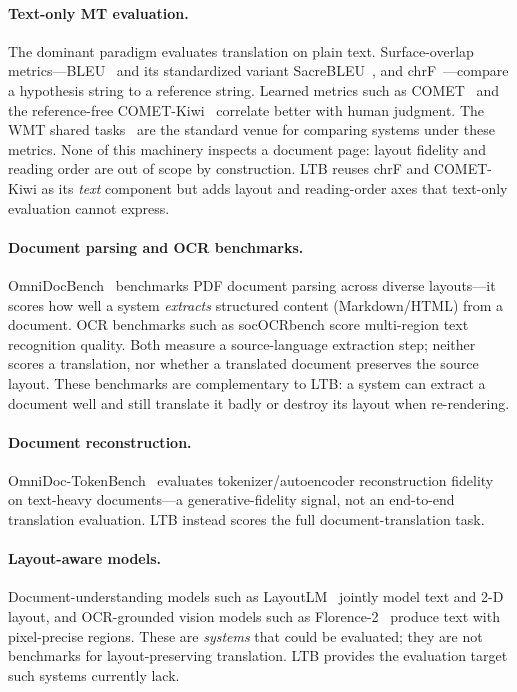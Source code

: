 \documentclass[11pt]{article}
\begin{document}
\paragraph{Text-only MT evaluation.} The dominant paradigm evaluates
translation on plain text. Surface-overlap metrics---BLEU~\citep{papineni2002bleu}
and its standardized variant SacreBLEU~\citep{post2018sacrebleu}, and
chrF~\citep{popovic2015chrf,popovic2017chrfpp}---compare a hypothesis string to
a reference string. Learned metrics such as COMET~\citep{rei2020comet} and the
reference-free COMET-Kiwi~\citep{rei2022cometkiwi} correlate better with human
judgment. The WMT shared tasks~\citep{kocmi2023wmt} are the standard venue for
comparing systems under these metrics. None of this machinery inspects a
document page: layout fidelity and reading order are out of scope by
construction. LTB reuses chrF and COMET-Kiwi as its \emph{text} component but
adds layout and reading-order axes that text-only evaluation cannot express.

\paragraph{Document parsing and OCR benchmarks.}
OmniDocBench~\citep{ouyang2024omnidocbench} benchmarks PDF document parsing
across diverse layouts---it scores how well a system \emph{extracts} structured
content (Markdown/HTML) from a document. OCR benchmarks such as socOCRbench
\citep{sococrbench} score multi-region text recognition quality. Both measure a
source-language extraction step; neither scores a translation, nor whether a
translated document preserves the source layout. These benchmarks are
complementary to LTB: a system can extract a document well and still translate
it badly or destroy its layout when re-rendering.

\paragraph{Document reconstruction.}
OmniDoc-TokenBench~\citep{omnidoctokenbench} evaluates tokenizer/autoencoder
reconstruction fidelity on text-heavy documents---a generative-fidelity signal,
not an end-to-end translation evaluation. LTB instead scores the full
document-translation task.

\paragraph{Layout-aware models.} Document-understanding models such as
LayoutLM~\citep{xu2020layoutlm} jointly model text and 2-D layout, and
OCR-grounded vision models such as Florence-2~\citep{xiao2024florence2} produce
text with pixel-precise regions. These are \emph{systems} that could be
evaluated; they are not benchmarks for layout-preserving translation. LTB
provides the evaluation target such systems currently lack.
\end{document}
